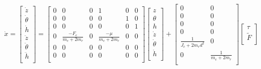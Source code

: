 \documentclass[dvips,12pt]{article}
\begin{document}
{\begin{gather}
 \dot{x}
 =
 \begin{bmatrix}
     \dot{z} \\
     \dot{\theta} \\
     \dot{h} \\
     \ddot{z} \\
     \ddot{\theta} \\
     \ddot{h} \\
   \end{bmatrix}
   =   
   \begin{bmatrix}
        0 & 0 & 0 & 1 & 0 & 0  \\
        0 & 0 & 0 & 0 & 1 & 0 \\
        0 & 0 & 0 & 0 & 0 & 1 \\
        0 & \frac{-F_e}{m_c + 2m_r} & 0 & \frac{-\mu}{m_c + 2m_r} & 0 & 0 \\
        0 & 0 & 0 & 0 & 0 & 0 \\
        0 & 0 & 0 & 0 & 0 & 0 \\
      \end{bmatrix}
      \begin{bmatrix}
           z \\
           \theta\\
           h \\
           \dot{z} \\
           \dot{\theta} \\
           \dot{h} \\
         \end{bmatrix}
         +
         \begin{bmatrix}
                    0 & 0\\
                    0 & 0\\
                    0 & 0\\
                    0 & 0\\
                    \frac{1}{J_c + 2m_r d^2} & 0\\
                    0 & \frac{1}{m_c + 2m_r}\\
                  \end{bmatrix}
                  \begin{bmatrix}
                                      \tau \\
                                      \tilde{F} \\
                                    \end{bmatrix}           
\end{gather}}
\end{document}
